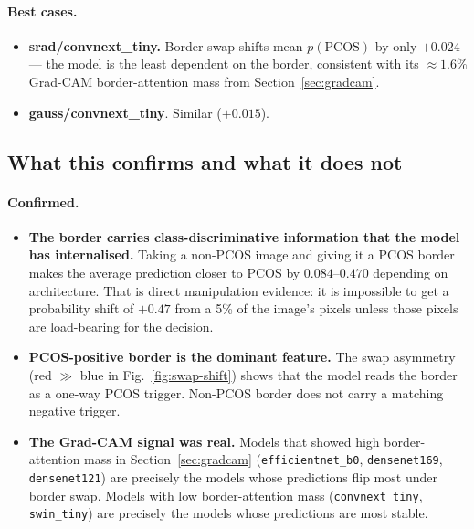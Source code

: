 \documentclass[11pt]{article}
\begin{document}
\paragraph{Best cases.}

\begin{itemize}
  \item \textbf{srad/convnext\_tiny.} Border swap shifts mean
        $p(\mathrm{PCOS})$ by only $+0.024$ --- the model is the least
        dependent on the border, consistent with its $\approx 1.6\%$
        Grad-CAM border-attention mass from
        Section~\ref{sec:gradcam}.
  \item \textbf{gauss/convnext\_tiny}. Similar ($+0.015$).
\end{itemize}

\subsection{What this confirms and what it does not}

\paragraph{Confirmed.}
\begin{itemize}
  \item \textbf{The border carries class-discriminative information
        that the model has internalised.}
        Taking a non-PCOS image and giving it a PCOS border makes the
        average prediction closer to PCOS by $0.084$--$0.470$
        depending on architecture. That is direct manipulation evidence:
        it is impossible to get a probability shift of $+0.47$ from a
        5\% of the image's pixels unless those pixels are load-bearing
        for the decision.
  \item \textbf{PCOS-positive border is the dominant
        feature.} The swap asymmetry (red $\gg$ blue in
        Fig.~\ref{fig:swap-shift}) shows that the model reads the
        border as a one-way PCOS trigger. Non-PCOS border does not
        carry a matching negative trigger.
  \item \textbf{The Grad-CAM signal was real.} Models that showed
        high border-attention mass in
        Section~\ref{sec:gradcam}
        (\texttt{efficientnet\_b0}, \texttt{densenet169},
        \texttt{densenet121}) are precisely the models whose
        predictions flip most under border swap. Models with low
        border-attention mass (\texttt{convnext\_tiny},
        \texttt{swin\_tiny}) are precisely the models whose
        predictions are most stable.
\end{itemize}
\end{document}
